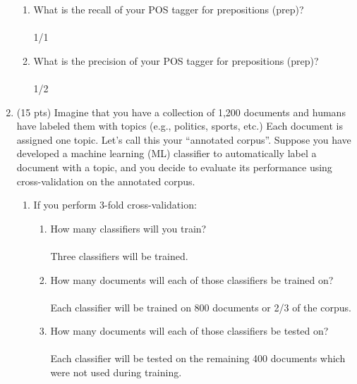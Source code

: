 \documentclass[11pt]{article}
\begin{document}
\begin{enumerate}
\begin{enumerate}
\item What is the recall of your POS tagger for prepositions ({\sc prep})?\\ ~ \\
1/1\\
\item What is the precision of your POS tagger for prepositions ({\sc prep})?\\ ~ \\
1/2\\

\end{enumerate}




\newpage
\item (15 pts) Imagine that you have a collection of 1,200 documents
  and humans have labeled them with topics (e.g., politics, sports,
  etc.) Each document is assigned one topic.  Let's call this your
  ``annotated corpus''.  Suppose you have developed a machine learning
  (ML) classifier to automatically label a document with a topic, and
  you decide to evaluate its performance using cross-validation on the
  annotated corpus.

\begin{enumerate}

\item If you perform 3-fold cross-validation:
\begin{enumerate}
\item How many classifiers will you train? \\ ~ \\
Three classifiers will be trained.\\
\item How many documents will each of those classifiers be trained on?\\ ~ \\
Each classifier will be trained on 800 documents or 2/3 of the corpus.\\
\item How many documents will each of those classifiers be tested on?\\ ~ \\
Each classifier will be tested on the remaining 400 documents which were not used during training.\\
\end{enumerate}


\end{enumerate}
\end{enumerate}
\end{document}
